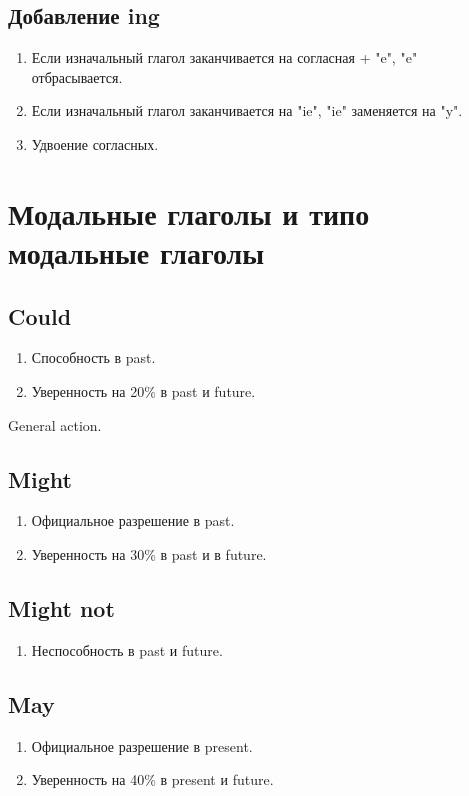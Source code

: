 \documentclass[oneside]{book}
\begin{document}
    \section{Добавление ing}
    \begin{enumerate}
        \item Если изначальный глагол заканчивается на согласная + "e"{}, "e"{ }отбрасывается.
        \item Если изначальный глагол заканчивается на "ie"{}, "ie"{ }заменяется на "y".
        \item Удвоение согласных.
    \end{enumerate}

    \chapter{Модальные глаголы и типо модальные глаголы}
    \section{Could}
    \begin{enumerate}
        \item Способность в past.
        \item Уверенность на 20\% в past и future.
    \end{enumerate}

    General action.

    \section{Might}
    \begin{enumerate}
        \item Официальное разрешение в past.
        \item Уверенность на 30\% в past и в future.
    \end{enumerate}

    \section{Might not}
    \begin{enumerate}
        \item Неспособность в past и future.
    \end{enumerate}

    \section{May}
    \begin{enumerate}
        \item Официальное разрешение в present.
        \item Уверенность на 40\% в present и future.
    \end{enumerate}
\end{document}
